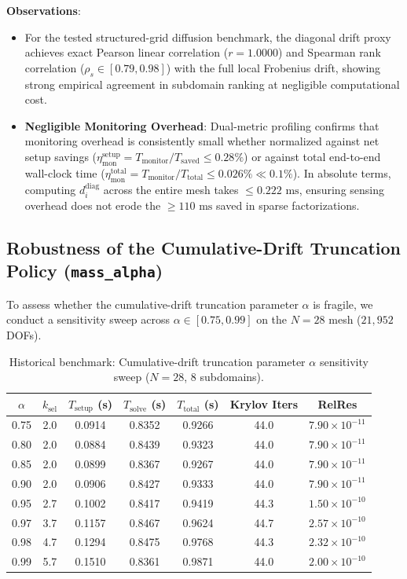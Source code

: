 \documentclass[preprint,12pt,3p]{elsarticle}
\begin{document}
\textbf{Observations}:
\begin{itemize}
    \item For the tested structured-grid diffusion benchmark, the diagonal drift proxy achieves exact Pearson linear correlation ($r = 1.0000$) and Spearman rank correlation ($\rho_s \in [0.79, 0.98]$) with the full local Frobenius drift, showing strong empirical agreement in subdomain ranking at negligible computational cost.
    \item \textbf{Negligible Monitoring Overhead}: Dual-metric profiling confirms that monitoring overhead is consistently small whether normalized against net setup savings ($\eta_{\text{mon}}^{\text{setup}} = T_{\text{monitor}} / T_{\text{saved}} \le 0.28\%$) or against total end-to-end wall-clock time ($\eta_{\text{mon}}^{\text{total}} = T_{\text{monitor}} / T_{\text{total}} \le 0.026\% \ll 0.1\%$). In absolute terms, computing $d_i^{\text{diag}}$ across the entire mesh takes $\le 0.222\text{ ms}$, ensuring sensing overhead does not erode the $\ge 110\text{ ms}$ saved in sparse factorizations.
\end{itemize}

\subsection{Robustness of the Cumulative-Drift Truncation Policy (\texttt{mass\_alpha})}
\label{subsec:res_truncation}
To assess whether the cumulative-drift truncation parameter $\alpha$ is fragile, we conduct a sensitivity sweep across $\alpha \in [0.75, 0.99]$ on the $N=28$ mesh ($21,952$ DOFs).

\begin{table}[htbp]
\centering
\small
\caption{Historical benchmark: Cumulative-drift truncation parameter $\alpha$ sensitivity sweep ($N=28$, 8 subdomains).}
\label{tab:pillar4_plateau}
\begin{tabular}{ccccccc}
\toprule
$\alpha$ & $k_{\text{sel}}$ & $T_{\text{setup}}$ (s) & $T_{\text{solve}}$ (s) & $T_{\text{total}}$ (s) & Krylov Iters & RelRes \\
\midrule
0.75 & 2.0 & 0.0914 & 0.8352 & 0.9266 & 44.0 & $7.90 \times 10^{-11}$ \\
0.80 & 2.0 & 0.0884 & 0.8439 & 0.9323 & 44.0 & $7.90 \times 10^{-11}$ \\
0.85 & 2.0 & 0.0899 & 0.8367 & 0.9267 & 44.0 & $7.90 \times 10^{-11}$ \\
0.90 & 2.0 & 0.0906 & 0.8427 & 0.9333 & 44.0 & $7.90 \times 10^{-11}$ \\
0.95 & 2.7 & 0.1002 & 0.8417 & 0.9419 & 44.3 & $1.50 \times 10^{-10}$ \\
0.97 & 3.7 & 0.1157 & 0.8467 & 0.9624 & 44.7 & $2.57 \times 10^{-10}$ \\
0.98 & 4.7 & 0.1294 & 0.8475 & 0.9768 & 44.3 & $2.32 \times 10^{-10}$ \\
0.99 & 5.7 & 0.1510 & 0.8361 & 0.9871 & 44.0 & $2.00 \times 10^{-10}$ \\
\bottomrule
\end{tabular}
\end{table}
\end{document}

